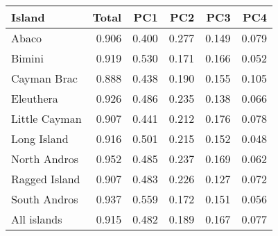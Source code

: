 
\begin{tabular}{lrrrrr}
\toprule
Island & Total & PC1 & PC2 & PC3 & PC4\\
\midrule
Abaco & 0.906 & 0.400 & 0.277 & 0.149 & 0.079\\
Bimini & 0.919 & 0.530 & 0.171 & 0.166 & 0.052\\
Cayman Brac & 0.888 & 0.438 & 0.190 & 0.155 & 0.105\\
Eleuthera & 0.926 & 0.486 & 0.235 & 0.138 & 0.066\\
Little Cayman & 0.907 & 0.441 & 0.212 & 0.176 & 0.078\\
Long Island & 0.916 & 0.501 & 0.215 & 0.152 & 0.048\\
North Andros & 0.952 & 0.485 & 0.237 & 0.169 & 0.062\\
Ragged Island & 0.907 & 0.483 & 0.226 & 0.127 & 0.072\\
South Andros & 0.937 & 0.559 & 0.172 & 0.151 & 0.056\\
All islands & 0.915 & 0.482 & 0.189 & 0.167 & 0.077\\
\bottomrule
\end{tabular}